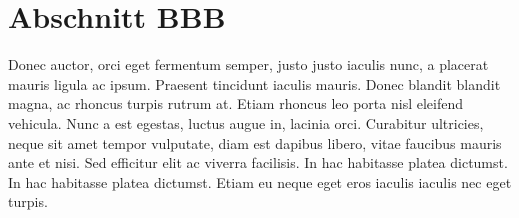 \section{Abschnitt BBB}

Donec auctor, orci eget fermentum semper, justo justo iaculis nunc, a placerat mauris ligula ac ipsum. Praesent tincidunt iaculis mauris. Donec blandit blandit magna, ac rhoncus turpis rutrum at. Etiam rhoncus leo porta nisl eleifend vehicula. Nunc a est egestas, luctus augue in, lacinia orci. Curabitur ultricies, neque sit amet tempor vulputate, diam est dapibus libero, vitae faucibus mauris ante et nisi. Sed efficitur elit ac viverra facilisis. In hac habitasse platea dictumst. In hac habitasse platea dictumst. Etiam eu neque eget eros iaculis iaculis nec eget turpis. 